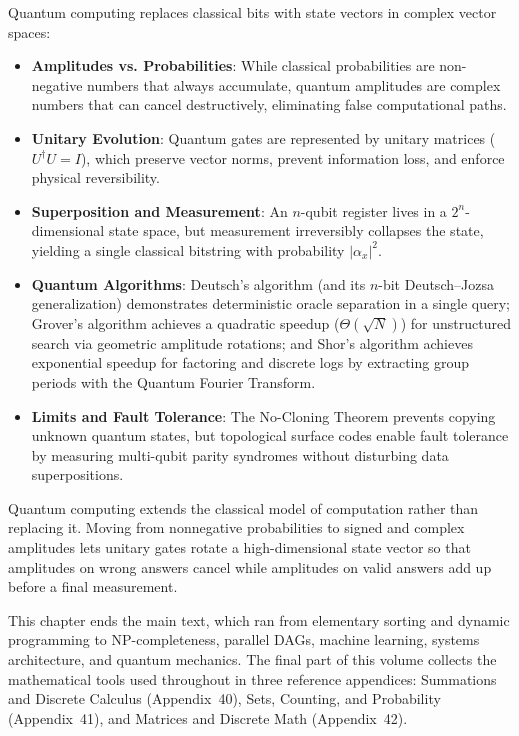 Quantum computing replaces classical bits with
state vectors in complex vector spaces:
\begin{itemize}
  \item \textbf{Amplitudes vs. Probabilities}: While classical probabilities are
    non-negative numbers that always accumulate, quantum amplitudes are complex
    numbers that can cancel destructively, eliminating false computational paths.
  \item \textbf{Unitary Evolution}: Quantum gates are represented by unitary
    matrices ($U^\dagger U = I$), which preserve vector norms, prevent information
    loss, and enforce physical reversibility.
  \item \textbf{Superposition and Measurement}: An $n$-qubit register lives in a
    $2^n$-dimensional state space, but measurement irreversibly collapses the state,
    yielding a single classical bitstring with probability $|\alpha_x|^2$.
  \item \textbf{Quantum Algorithms}: Deutsch's algorithm (and its $n$-bit
    Deutsch--Jozsa generalization) demonstrates deterministic
    oracle separation in a single query; Grover's algorithm achieves a quadratic
    speedup ($\Theta(\sqrt{N})$) for unstructured search via geometric amplitude
    rotations; and Shor's algorithm achieves exponential speedup for factoring and
    discrete logs by extracting group periods with the Quantum Fourier Transform.
  \item \textbf{Limits and Fault Tolerance}: The No-Cloning Theorem prevents
    copying unknown quantum states, but topological surface codes enable fault
    tolerance by measuring multi-qubit parity syndromes without disturbing data
    superpositions.
\end{itemize}

\begin{aestheticbox}
Quantum computing extends the classical model of computation rather than replacing it.
Moving from nonnegative probabilities to signed and complex amplitudes lets unitary gates
rotate a high-dimensional state vector so that amplitudes on wrong answers cancel while
amplitudes on valid answers add up before a final measurement.
\end{aestheticbox}

This chapter ends the main text, which ran from
elementary sorting and dynamic programming to NP-completeness, parallel DAGs,
machine learning, systems architecture, and quantum mechanics. The final part of
this volume collects the mathematical tools used throughout in
three reference appendices: Summations and Discrete Calculus
(Appendix~40), Sets, Counting, and Probability
(Appendix~41), and Matrices and Discrete Math
(Appendix~42).


